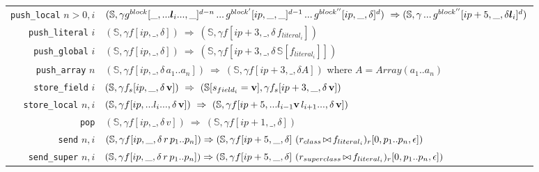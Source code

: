 \documentclass[11pt]{article}
\begin{document}
\begin{figure}
\begin{center}
\begin{tabular}[t]{|r|l|}
{\tt push\_local} $n > 0, i$ &
\begin{minipage}[t]{.78\linewidth}
$(\mathbb{S},\gamma g^{block}[\_,... {\bm l_i} ...,\_]^{d-n} \,...\, g^{block'}[ip,\_,\_]^{d-1}\,...\, g^{block''}[ip,\_,\delta]^{d}) ~\Rightarrow\\
(\mathbb{S},\gamma\, ... \,g^{block''}[ip+5,\_,\delta {\bm l_i}]^{d})$
\end{minipage} \\

{\tt push\_literal} $i$ & $(\mathbb{S},\gamma f[ip,\_,\delta]) ~\Rightarrow~ (\mathbb{S},\gamma f[ip+3,\_,\delta \,f_{literal_i}])$ \\

{\tt push\_global} $i$  & $(\mathbb{S},\gamma f[ip,\_,\delta]) ~\Rightarrow~ (\mathbb{S},\gamma f[ip+3,\_,\delta \,\mathbb{S}[f_{literal_i}]])$ \\

{\tt push\_array} $n$  &  $(\mathbb{S},\gamma f[ip,\_,\delta\,a_1..a_n]) ~\Rightarrow~ (\mathbb{S}, \gamma f[ip+3,\_,\delta A])$ where $A = Array(a_1..a_n)$ \\

{\tt store\_field} $i$ & $(\mathbb{S}, \gamma f_s[ip,\_,\delta \,{\bf v}]) ~\Rightarrow~ (\mathbb{S}[s_{field_i} = {\bf v}],\gamma f_s[ip+3,\_,\delta\, {\bf v}])$ \\

{\tt store\_local} $n,i$ & $(\mathbb{S},\gamma f[ip, ...l_i...,\delta \,{\bf v}]) ~\Rightarrow~ (\mathbb{S},\gamma f[ip+5,...l_{i-1} {\bf v} \,l_{i+1}...,\delta \,{\bf v}])$ \\

{\tt pop} & $(\mathbb{S},\gamma f[ip,\_,\delta \,v]) ~\Rightarrow~ (\mathbb{S},\gamma f[ip+1,\_,\delta])$\\
\hline

{\tt send} $n,i$ & 
\begin{minipage}[c]{.78\linewidth}
$(\mathbb{S},\gamma f[ip,\_,\delta \,r\, p_1 .. p_{n}]) \Rightarrow 
(\mathbb{S},\gamma f[ip+5,\_,\delta] ~(r_{class}\,{\small \bowtie} \,f_{literal_i})_r[0,p_1 .. p_{n},\epsilon])$
\end{minipage}\\

{\tt send\_super} $n,i$ & 
\begin{minipage}[c]{.78\linewidth}
$(\mathbb{S},\gamma f[ip,\_,\delta \,r\, p_1 .. p_{n}]) \Rightarrow 
(\mathbb{S},\gamma f[ip+5,\_,\delta] ~(r_{superclass}\,{\small \bowtie} \,f_{literal_i})_r[0,p_1 .. p_{n},\epsilon])$
\end{minipage}\\


\end{tabular}
\end{center}
\end{figure}
\end{document}
